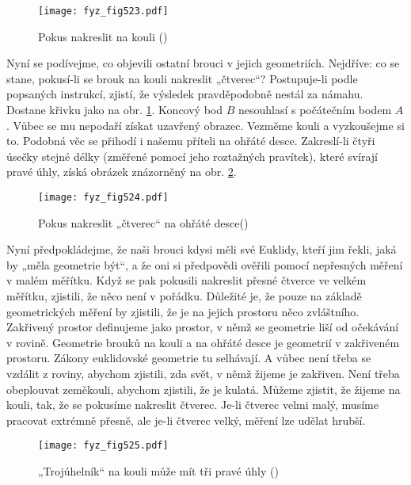     \begin{figure}[ht!] %
      \centering
      \texttt{[image: fyz\_fig523.pdf]}
      \caption{Pokus nakreslit  na kouli
               (\cite[s.~777]{Feynman02})}
      \label{fyz:fig523}
    \end{figure}

    Nyní se podívejme, co objevili ostatní brouci v jejich geometriích. Nejdříve: co se stane, 
    pokusí-li se brouk na kouli nakreslit „čtverec“? Postupuje-li podle popsaných instrukcí, 
    zjistí, že výsledek pravděpodobně nestál za námahu. Dostane křivku jako na obr. 
    \ref{fyz:fig523}. Koncový bod \(B\) nesouhlasí s počátečním bodem \(A\). Vůbec se mu nepodaří 
    získat uzavřený obrazec. Vezměme kouli a vyzkoušejme si to. Podobná věc se přihodí i našemu 
    příteli na ohřáté desce. Zakreslí-li čtyři úsečky stejné délky (změřené pomocí jeho roztažných 
    pravítek), které svírají pravé úhly, získá obrázek znázorněný na obr. \ref{fyz:fig524}.

    \begin{figure}[ht!] %
      \centering
      \texttt{[image: fyz\_fig524.pdf]}
      \caption{Pokus nakreslit „čtverec“ na ohřáté desce(\cite[s.~778]{Feynman02})}
      \label{fyz:fig524}
    \end{figure}
   
    Nyní předpokládejme, že naši brouci kdysi měli své Euklidy, kteří jim řekli, jaká by „měla 
    geometrie být“, a že oni si předpovědi ověřili pomocí nepřesných měření v malém měřítku. Když 
    se pak pokusili nakreslit přesné čtverce ve velkém měřítku, zjistili, že něco není v pořádku. 
    Důležité je, že pouze na základě geometrických měření by zjistili, že je na jejich prostoru 
    něco zvláštního. Zakřivený prostor definujeme jako prostor, v němž se geometrie liší od 
    očekávání v rovině. Geometrie brouků na kouli a na ohřáté desce je geometrií v zakřiveném 
    prostoru. Zákony euklidovské geometrie tu selhávají. A vůbec není třeba se vzdálit z roviny, 
    abychom zjistili, zda svět, v němž žijeme je zakřiven. Není třeba obeplouvat zeměkouli, abychom 
    zjistili, že je kulatá. Můžeme zjistit, že žijeme na kouli, tak, že se pokusíme nakreslit 
    čtverec. Je-li čtverec velmi malý, musíme pracovat extrémně přesně, ale je-li čtverec velký, 
    měření lze udělat hrubší.

    \begin{figure}[ht!] %
      \centering
      \texttt{[image: fyz\_fig525.pdf]}
      \caption{„Trojúhelník“ na kouli může mít tři pravé úhly (\cite[s.~778]{Feynman02})}
      \label{fyz:fig525}
    \end{figure}
    
